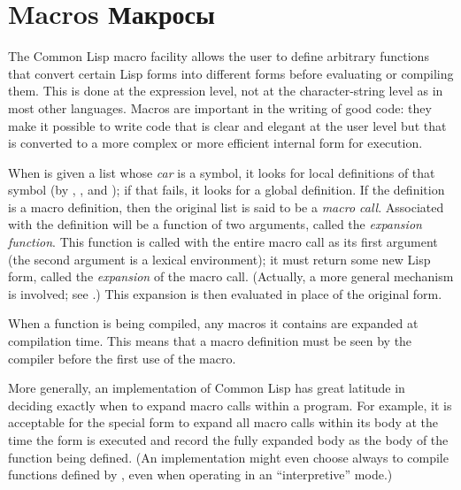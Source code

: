 
\clearpage\def\pagestatus{ULTIMATE}

\ifx \rulang\Undef

\chapter{Macros Макросы}
\label{MACROS}

The Common Lisp macro facility allows the user to define arbitrary
functions that convert certain Lisp forms into different forms before
evaluating or compiling them.  This is done at the expression level,
not at the character-string level as in most other languages.  Macros
are important in the writing of good code: they make it possible to
write code that is clear and elegant at the user level but that is
converted to a more complex or more efficient internal form for
execution.

When  is given a list whose \emph{car} is a symbol, it looks
for local definitions of that symbol (by , ,
and ); if that fails, it looks for a global definition.
If the definition is a macro definition, then the original
list is said to be a \emph{macro call}.  Associated with the definition
will be a function of two arguments, called the \emph{expansion function}.
This function is called with the entire macro call as its first argument
(the second argument is a lexical environment);
it must return some new Lisp form, called the \emph{expansion} of the
macro call.  (Actually, a more general mechanism is involved;
see .)
This expansion is then evaluated in place of the original
form.

When a function is being compiled, any macros it contains are expanded
at compilation time.  This means that a macro definition must be seen by the
compiler before the first use of the macro.

More generally, an implementation of Common Lisp has great latitude in deciding
exactly when to expand macro calls within a program.  For example,
it is acceptable for the  special form to expand all macro
calls within its body at the time the  form is executed
and record the fully expanded body as the body of the function
being defined.
(An implementation might even choose always to compile functions defined
by , even when operating in an ``interpretive'' mode.)

